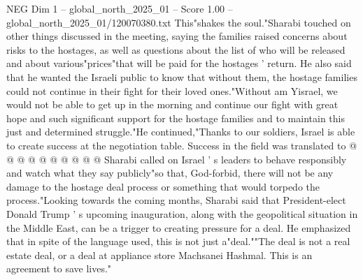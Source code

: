 \begin{textsample}{NEG Dim 1 – global\_north\_2025\_01 – Score 1.00 – global\_north\_2025\_01/120070380.txt}
This"shakes the soul."Sharabi touched on other things discussed in the meeting, saying the families raised concerns about risks to the hostages, as well as questions about the list of who will be released and about various"prices"that will be paid for the hostages ' return.
He also said that he wanted the Israeli public to know that without them, the hostage families could not continue in their fight for their loved ones."Without am Yisrael, we would not be able to get up in the morning and continue our fight with great hope and such significant support for the hostage families and to maintain this just and determined struggle."He continued,"Thanks to our soldiers, Israel is able to create success at the negotiation table.
Success in the field was translated to @ @ @ @ @ @ @ @ @ @ Sharabi called on Israel ' s leaders to behave responsibly and watch what they say publicly"so that, God-forbid, there will not be any damage to the hostage deal process or something that would torpedo the process."Looking towards the coming months, Sharabi said that President-elect Donald Trump ' s upcoming inauguration, along with the geopolitical situation in the Middle East, can be a trigger to creating pressure for a deal.
He emphasized that in spite of the language used, this is not just a"deal.""The deal is not a real estate deal, or a deal at appliance store Machsanei Hashmal.
This is an agreement to save lives."

\end{textsample}
